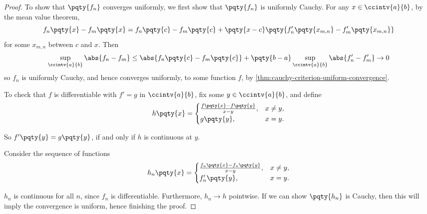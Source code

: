 \begin{proof}
    To show that \(\pqty{f_n}\) converges uniformly, we first show that \(\pqty{f_n}\) is uniformly Cauchy. For any \(x \in \ccintv{a}{b}\), by the mean value theorem,
    \[
        f_n\pqty{x} - f_m\pqty{x} = f_n\pqty{c} - f_m\pqty{c} + \pqty{x - c} \pqty{f_n'\pqty{x_{m, n}} - f_m'\pqty{x_{m, n}}}
    \]
    for some \(x_{m, n}\) between \(c\) and \(x\). Then
    \[
        \sup_{\ccintv{a}{b}} \abs{f_n - f_m} \leq \abs{f_n\pqty{c} - f_m\pqty{c}} + \pqty{b - a} \sup_{\ccintv{a}{b}} \abs{f_n' - f_m'} \to 0
    \]
    so \(f_n\) is uniformly Cauchy, and hence converges uniformly, to some function \(f\), by \autoref{thm:cauchy-criterion-uniform-convergence}.

    To check that \(f\) is differentiable with \(f' = g\) in \(\ccintv{a}{b}\), fix some \(y \in \ccintv{a}{b}\), and define
    \[
        h\pqty{x} = \begin{cases}
            \frac{f\pqty{x} - f\pqty{y}}{x - y}, & x \neq y, \\
            g\pqty{y}, & x = y.
        \end{cases}
    \]

    So \(f'\pqty{y} = g\pqty{y}\), if and only if \(h\) is continuous at \(y\).

    Consider the sequence of functions
    \[
        h_n\pqty{x} = \begin{cases}
            \frac{f_n\pqty{x} - f_n\pqty{y}}{x - y}, & x \neq y, \\
            f_n'\pqty{y}, & x = y.
        \end{cases}
    \]

    \(h_n\) is continuous for all \(n\), since \(f_n\) is differentiable. Furthermore, \(h_n \to h\) pointwise. If we can show \(\pqty{h_n}\) is Cauchy, then this will imply the convergence is uniform, hence finishing the proof.


\end{proof}
